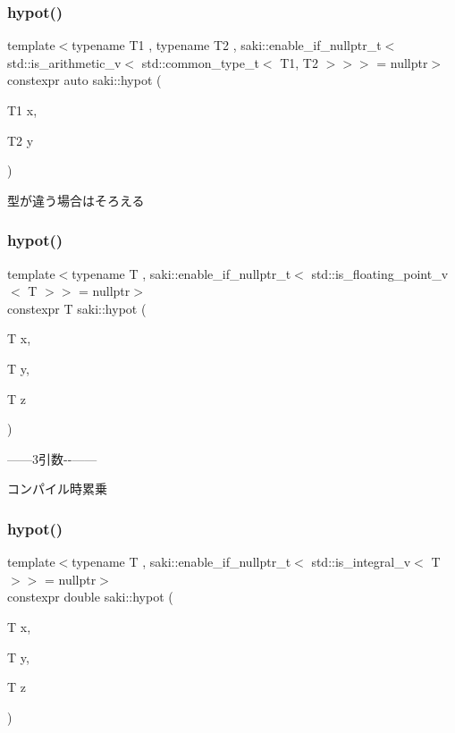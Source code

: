 \subsubsection{\texorpdfstring{hypot()}{hypot()}\hspace{0.1cm}{\footnotesize\ttfamily [3/6]}}
{\footnotesize\ttfamily template$<$typename T1 , typename T2 , saki\+::enable\+\_\+if\+\_\+nullptr\+\_\+t$<$ std\+::is\+\_\+arithmetic\+\_\+v$<$ std\+::common\+\_\+type\+\_\+t$<$ T1, T2 $>$$>$$>$  = nullptr$>$ \\
constexpr auto saki\+::hypot (\begin{DoxyParamCaption}\item[{T1}]{x,  }\item[{T2}]{y }\end{DoxyParamCaption})}



型が違う場合はそろえる 

\mbox{\label{namespacesaki_a56768ecf1270205a8c9b3ac8cdf4a590}} 
\subsubsection{\texorpdfstring{hypot()}{hypot()}\hspace{0.1cm}{\footnotesize\ttfamily [4/6]}}
{\footnotesize\ttfamily template$<$typename T , saki\+::enable\+\_\+if\+\_\+nullptr\+\_\+t$<$ std\+::is\+\_\+floating\+\_\+point\+\_\+v$<$ T $>$$>$  = nullptr$>$ \\
constexpr T saki\+::hypot (\begin{DoxyParamCaption}\item[{T}]{x,  }\item[{T}]{y,  }\item[{T}]{z }\end{DoxyParamCaption})}



------3引数-\/-\/------ 

コンパイル時累乗 \mbox{\label{namespacesaki_ad56e1232bb063b3bc0e7cf2b3f655247}} 
\subsubsection{\texorpdfstring{hypot()}{hypot()}\hspace{0.1cm}{\footnotesize\ttfamily [5/6]}}
{\footnotesize\ttfamily template$<$typename T , saki\+::enable\+\_\+if\+\_\+nullptr\+\_\+t$<$ std\+::is\+\_\+integral\+\_\+v$<$ T $>$$>$  = nullptr$>$ \\
constexpr double saki\+::hypot (\begin{DoxyParamCaption}\item[{T}]{x,  }\item[{T}]{y,  }\item[{T}]{z }\end{DoxyParamCaption})}



